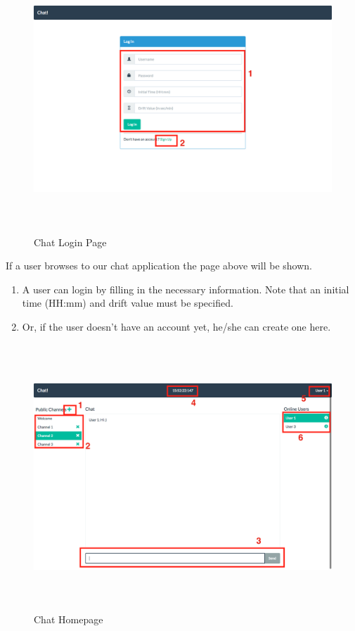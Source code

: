 \documentclass[11pt]{article}
\begin{document}
\begin{figure}[H]
\centering
\includegraphics[height=100mm]{login.png}
\caption{Chat Login Page}
\end{figure}

If a user browses to our chat application the page above will be shown.

\begin{enumerate}
	\item A user can login by filling in the necessary information. Note that an initial time (HH:mm) and drift value must be specified.
	\item Or, if the user doesn't have an account yet, he/she can create one here.
\end{enumerate}

\begin{figure}[H]
\centering
\includegraphics[height=100mm]{chat.png}
\caption{Chat Homepage}
\end{figure}
\end{document}
